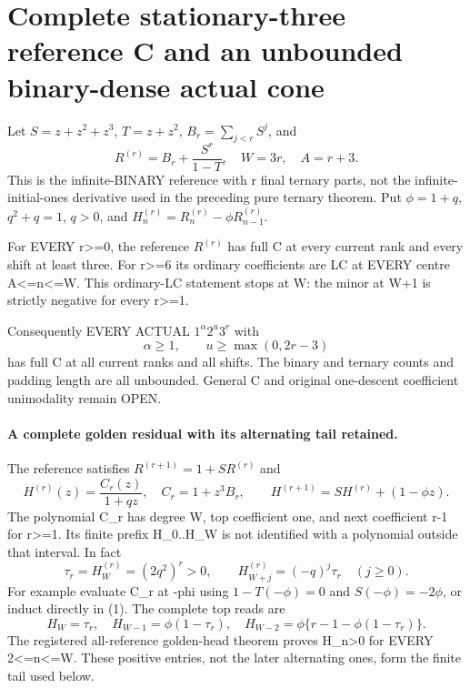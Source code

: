 \section{Complete stationary-three reference C and an unbounded binary-dense actual cone}
Let $S=z+z^2+z^3$, $T=z+z^2$, $B_r=\sum_{j<r}S^j$, and
\[
 R^{(r)}=B_r+\frac{S^r}{1-T},\quad W=3r,\quad A=r+3.
\]
This is the infinite-BINARY reference with r final ternary parts,
not the infinite-initial-ones derivative used in the preceding pure
ternary theorem. Put $\phi=1+q$, $q^2+q=1$, $q>0$, and
$H^{(r)}_n=R^{(r)}_n-\phi R^{(r)}_{n-1}$.

\begin{theorem}
For EVERY r>=0, the reference $R^{(r)}$ has full C at every current
rank and every shift at least three. For r>=6 its ordinary coefficients
are LC at EVERY centre A<=n<=W. This ordinary-LC statement stops
at W: the minor at W+1 is strictly negative for every r>=1.

Consequently EVERY ACTUAL $1^\alpha2^u3^r$ with
\[
                 \alpha\ge1,\qquad u\ge\max(0,2r-3)
\]
has full C at all current ranks and all shifts. The binary and ternary
counts and padding length are all unbounded. General C and original
one-descent coefficient unimodality remain OPEN.
\end{theorem}

\paragraph{A complete golden residual with its alternating tail retained.}
The reference satisfies $R^{(r+1)}=1+S R^{(r)}$ and
\[
 H^{(r)}(z)=\frac{C_r(z)}{1+qz},\quad C_r=1+z^3B_r,\qquad
 H^{(r+1)}=S H^{(r)}+(1-\phi z).                 \tag{1}
\]
The polynomial C_r has degree W, top coefficient one, and next
coefficient r-1 for r>=1. Its finite prefix H_0..H_W is not
identified with a polynomial outside that interval. In fact
\[
 \tau_r=H^{(r)}_W=(2q^2)^r>0,\qquad
 H^{(r)}_{W+j}=(-q)^j\tau_r\quad(j\ge0).         \tag{2}
\]
For example evaluate C_r at -phi using $1-T(-\phi)=0$ and
$S(-\phi)=-2\phi$, or induct directly in (1). The complete top
reads are
\[
 H_W=\tau_r,\quad H_{W-1}=\phi(1-\tau_r),\quad
 H_{W-2}=\phi\{r-1-\phi(1-\tau_r)\}.           \tag{3}
\]
The registered all-reference golden-head theorem proves H_n>0
for EVERY 2<=n<=W. These positive entries, not the later alternating
ones, form the finite tail used below.

